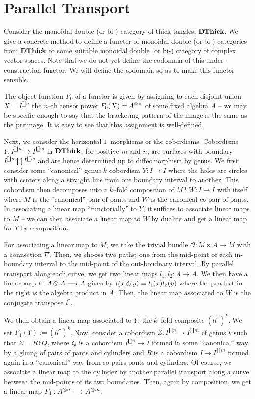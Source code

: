 \documentclass[./Thick_TQFTs_and_Quantum_Information.tex]{subfiles}
\begin{document}
\section{Parallel Transport}

Consider the monoidal double (or bi-) category of thick tangles, $\textbf{DThick}$. We
give a concrete method to define a functor of monoidal double (or bi-)
categories from $\textbf{DThick}$ to some suitable monoidal double (or bi-) category of
complex vector spaces. Note that we do not yet define the codomain of this
under-construction functor. We will define the codomain so as to make this
functor sensible.

The object function $F_0$ of a functor is given by assigning to each disjoint
union $X = I^{\amalg n}$ the $n$--th tensor power $F_0(X) = A^{\otimes n}$ of
some fixed algebra $A$ -- we may be specific enough to say that the bracketing
pattern of the image is the same as the preimage. It is easy to see that this
assignment is well-defined.

Next, we consider the horizontal $1$--morphisms or the cobordisms. Cobordisms
$Y : I^{\amalg n} \to I^{\amalg m}$ in $\textbf{DThick}$, for positive $m$ and $n$, are
surfaces with boundary $I^{\amalg n} \amalg I^{\amalg m}$ and are hence
determined up to diffeomorphism by genus. We first consider some ``canonical''
genus $k$ cobordism $Y : I \to I$ where the holes are circles with centers along
a straight line from one boundary interval to another. This cobordism then
decomposes into a $k$--fold composition of $M * W : I \to I$ with itself where
$M$ is the ``canonical'' pair-of-pants and $W$ is the canonical
co-pair-of-pants. In associating a linear map ``functorially'' to $Y$, it
suffices to associate linear maps to $M$ -- we can then associate a linear map
to $W$ by duality and get a linear map for $Y$ by composition.

For associating a linear map to $M$, we take the trivial bundle
$\mathcal{O} : M \times A \to M$ with a connection $\nabla$. Then, we choose two
paths: one from the mid-point of each in-boundary interval to the mid-point of
the out-boudnary interval. By parallel transport along each curve, we get two
linear maps $l_1, l_2 : A \to A$. We then have a linear map
$l : A \otimes A \stackrel{}{\longrightarrow} A$ given by $l(x \otimes y) = l_1(x)l_2(y)$ where the
product in the right is the algebra product in $A$. Then, the linear map
associated to $W$ is the conjugate transpose $l^{\dagger}$.

We then obtain a linear map associated to $Y$: the $k$--fold composite
$(ll^{\dagger})^k$. We set $F_1(Y) := (ll^{\dagger})^k$. Now, consider a
cobordism $Z : I^{\amalg n} \to I^{\amalg m}$ of genus $k$ such that
$Z = RYQ$, where $Q$ is a cobordism $I^{\amalg n} \to I$ formed in some
``canonical'' way by a gluing of pairs of pants and cylinders and $R$ is a
cobordism $I \to I^{\amalg m}$ formed again in a ``canonical'' way from
co-pairs pants and cylinders. Of course, we associate a linear map to the
cylinder by another parallel transport along a curve between the mid-points of
its two boundaries. Then, again by composition, we get a linear map
$F_1 : A^{\otimes n} \stackrel{}{\longrightarrow} A^{\otimes m}$.
\end{document}

